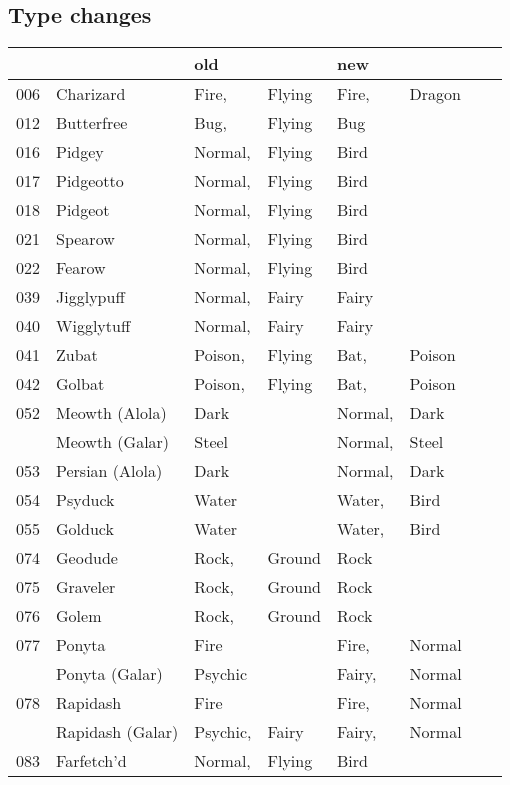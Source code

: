 \documentclass{article}
\begin{document}
\subsection{Type changes}
\small
\begin{longtable}{rl|ll|llll}
 &  & \textbf{old} &  & \textbf{new} &  &  &  \\
\hline
006 & Charizard & Fire, & Flying & Fire, & Dragon &  &  \\
012 & Butterfree & Bug, & Flying & Bug &  &  &  \\
016 & Pidgey & Normal, & Flying & Bird &  &  &  \\
017 & Pidgeotto & Normal, & Flying & Bird &  &  &  \\
018 & Pidgeot & Normal, & Flying & Bird &  &  &  \\
021 & Spearow & Normal, & Flying & Bird &  &  &  \\
022 & Fearow & Normal, & Flying & Bird &  &  &  \\
039 & Jigglypuff & Normal, & Fairy & Fairy &  &  &  \\
040 & Wigglytuff & Normal, & Fairy & Fairy &  &  &  \\
041 & Zubat & Poison, & Flying & Bat, & Poison &  &  \\
042 & Golbat & Poison, & Flying & Bat, & Poison &  &  \\
052 & Meowth (Alola) & Dark &  & Normal, & Dark &  &  \\
    & Meowth (Galar) & Steel &  & Normal, & Steel &  &  \\
053 & Persian (Alola) & Dark &  & Normal, & Dark &  &  \\
054 & Psyduck & Water &  & Water, & Bird &  &  \\
055 & Golduck & Water &  & Water, & Bird &  &  \\
074 & Geodude & Rock, & Ground & Rock &  &  &  \\
075 & Graveler & Rock, & Ground & Rock &  &  &  \\
076 & Golem & Rock, & Ground & Rock &  &  &  \\
077 & Ponyta & Fire &  & Fire, & Normal &  &  \\
    & Ponyta (Galar) & Psychic &  & Fairy, & Normal &  &  \\
078 & Rapidash & Fire &  & Fire, & Normal &  &  \\
    & Rapidash (Galar) & Psychic, & Fairy & Fairy, & Normal &  &  \\
083 & Farfetch'd & Normal, & Flying & Bird &  &  &  \\

\end{longtable}
\end{document}
